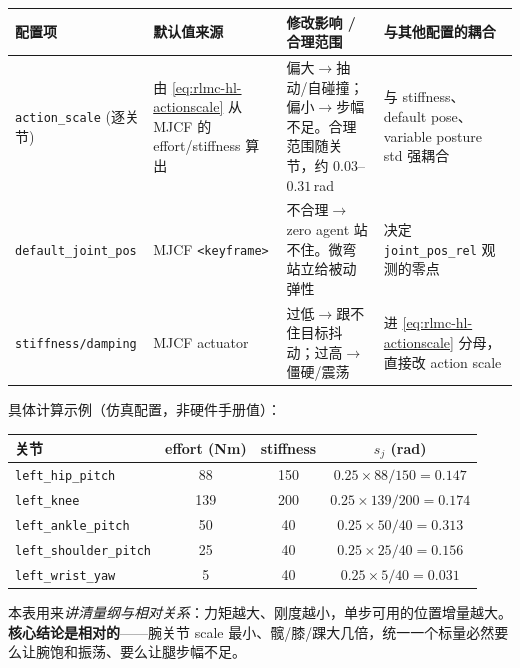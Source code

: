 \begin{center}
\small
\begin{tabular}{p{2.6cm}p{2.6cm}p{3.2cm}p{4.0cm}}
\hline
配置项 & 默认值来源 & 修改影响 / 合理范围 & 与其他配置的耦合 \\
\hline
\texttt{action\_scale} (逐关节) & 由 \eqref{eq:rlmc-hl-actionscale} 从 MJCF 的 effort/stiffness 算出 & 偏大$\to$抽动/自碰撞；偏小$\to$步幅不足。合理范围随关节，约 $0.03$--$0.31$\,rad & 与 stiffness、default pose、variable posture std 强耦合 \\
\texttt{default\_joint\_pos} & MJCF \texttt{<keyframe>} & 不合理$\to$zero agent 站不住。微弯站立给被动弹性 & 决定 \verb|joint_pos_rel| 观测的零点 \\
\texttt{stiffness/\allowbreak damping} & MJCF actuator & 过低$\to$跟不住目标抖动；过高$\to$僵硬/震荡 & 进 \eqref{eq:rlmc-hl-actionscale} 分母，直接改 action scale \\
\hline
\end{tabular}
\end{center}

具体计算示例（仿真配置，非硬件手册值）：

\begin{center}
\small
\begin{tabular}{lccc}
\hline
关节 & effort (Nm) & stiffness & $s_j$ (rad) \\
\hline
\texttt{left\_hip\_pitch} & 88 & 150 & $0.25\times88/150=0.147$ \\
\texttt{left\_knee} & 139 & 200 & $0.25\times139/200=0.174$ \\
\texttt{left\_ankle\_pitch} & 50 & 40 & $0.25\times50/40=0.313$ \\
\texttt{left\_shoulder\_pitch} & 25 & 40 & $0.25\times25/40=0.156$ \\
\texttt{left\_wrist\_yaw} & 5 & 40 & $0.25\times5/40=0.031$ \\
\hline
\end{tabular}
\end{center}

本表用来\emph{讲清量纲与相对关系}：力矩越大、刚度越小，单步可用的位置增量越大。\textbf{核心结论是相对的}——腕关节 scale 最小、髋/膝/踝大几倍，统一一个标量必然要么让腕饱和振荡、要么让腿步幅不足。


